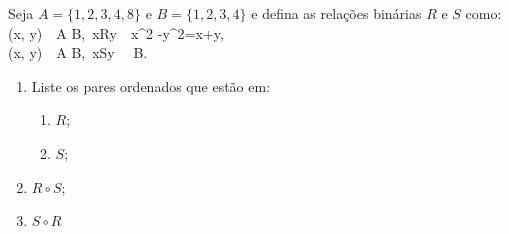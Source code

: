 \item 
 Seja $A = \{1, 2, 3, 4, 8\}$ e $B = \{1, 2, 3, 4\}$ e defina as relações binárias $R$ e $S$ como:
 \ben
\forall (x, y)\ \in\ A \times B,\ xRy\ \Leftrightarrow\ x^2 -y^2=x+y, \\
\forall (x, y)\ \in\ A \times B,\ xSy\ \Leftrightarrow\   \in B.
\een
\begin{enumerate}
\item Liste os pares ordenados que estão em:
\begin{enumerate}
	\item $R$; 
	\item $S$; 
\end{enumerate}
\item $R\circ S$;
\item $S\circ R$ 
\end{enumerate}


